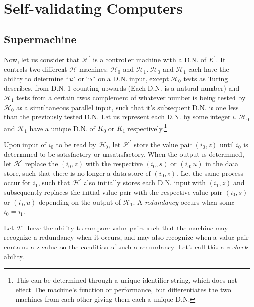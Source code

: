 \documentclass[11pt]{article}
\begin{document}
\section{Self-validating Computers}
\subsection{Supermachine} %


Now, let us consider that $\mathscr{H}^{'}$ is a controller machine with a D.N. of $K^{'}$. It controls two different $\mathscr{H}$ machines: $\mathscr{H}_0$ and $\mathscr{H}_1$. $\mathscr{H}_0$ and $\mathscr{H}_1$ each have the  ability to determine ``$\emph{u}$" or ``$\emph{s}$" on a D.N. input, except $\mathscr{H}_0$ tests as Turing describes, from D.N. 1 counting upwards (Each D.N. is a natural number) and $\mathscr{H}_1$ tests from a certain twos complement of whatever number is being tested by $\mathscr{H}_0$ as a simultaneous parallel input, such that it's subsequent D.N. is one less than the previously tested D.N. Let us represent each D.N. by some integer $i$. $\mathscr{H}_0$ and $\mathscr{H}_1$ have a unique D.N. of $K_0$ or $K_1$ respectively.\footnote{This can be determined through a unique identifier string, which does not effect The machine's function or performance, but differentiates the two machines from each other giving them each a unique D.N.}

Upon input of $i_0$ to be read by $\mathscr{H}_0$, let $\mathscr{H}^{'}$ store the value pair $(i_0, z)$ until $i_0$ is determined to be satisfactory or unsatisfactory. When the output is determined, let $\mathscr{H}^{'}$ replace the $(i_0, z)$ with the respective $(i_0, s)$ or $(i_0, u)$ in the data store, such that there is no longer a data store of  $(i_0, z)$. Let the same process occur for $i_1$, such that $\mathscr{H}^{'}$ also initially stores each D.N. input with $(i_1, z)$ and subsequently replaces the initial value pair with the respective value pair $(i_0, s)$ or $(i_0, u)$ depending on the output of $\mathscr{H}_1$. A \emph{redundancy} occurs when some $i_0 = i_1$. 

Let $\mathscr{H}^{'}$ have the ability to compare value pairs such that the machine may recognize a redundancy when it occurs, and may also recognize when a value pair contains a z value on the condition of such a redundancy. Let's call this a \emph{z-check} ability.
\end{document}
